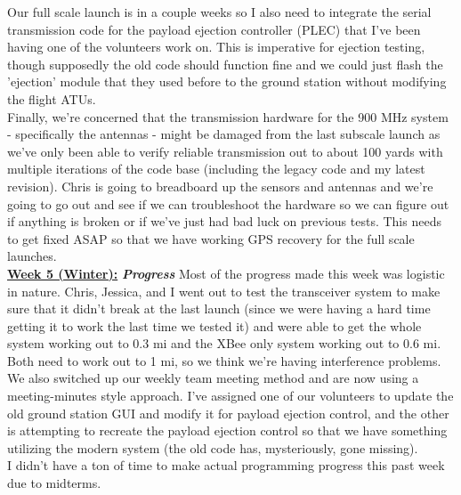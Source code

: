 \documentclass[onecolumn, draftclsnofoot, 10pt, compsoc]{IEEEtran}
\begin{document}
Our full scale launch is in a couple weeks so I also need to integrate the serial transmission code for the payload ejection controller (PLEC) that I've been having one of the volunteers work on. This is imperative for ejection testing, though supposedly the old code should function fine and we could just flash the 'ejection' module that they used before to the ground station without modifying the flight ATUs. \\ 

Finally, we're concerned that the transmission hardware for the 900 MHz system - specifically the antennas - might be damaged from the last subscale launch as we've only been able to verify reliable transmission out to about 100 yards with multiple iterations of the code base (including the legacy code and my latest revision). Chris is going to breadboard up the sensors and antennas and we're going to go out and see if we can troubleshoot the hardware so we can figure out if anything is broken or if we've just had bad luck on previous tests. This needs to get fixed ASAP so that we have working GPS recovery for the full scale launches. \\

\underline{\textbf{Week 5 (Winter):}}
\newline\textbf{\textit{{Progress}}}
\newline Most of the progress made this week was logistic in nature. Chris, Jessica, and I went out to test the transceiver system to make sure that it didn't break at the last launch (since we were having a hard time getting it to work the last time we tested it) and were able to get the whole system working out to 0.3 mi and the XBee only system working out to 0.6 mi. Both need to work out to 1 mi, so we think we're having interference problems. \\

We also switched up our weekly team meeting method and are now using a meeting-minutes style approach. I've assigned one of our volunteers to update the old ground station GUI and modify it for payload ejection control, and the other is attempting to recreate the payload ejection control so that we have something utilizing the modern system (the old code has, mysteriously, gone missing). \\

I didn't have a ton of time to make actual programming progress this past week due to midterms. \\
\end{document}
